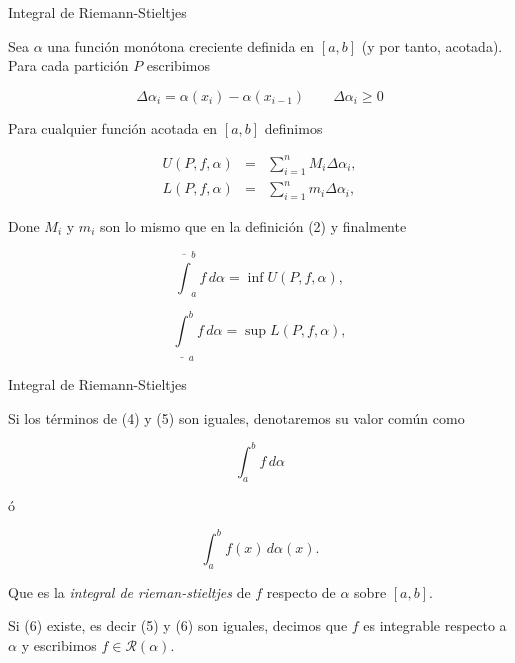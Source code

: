 \documentclass[10pt]{beamer}
\begin{document}
\begin{frame}{Integral de Riemann-Stieltjes}

Sea $\alpha$ una función monótona creciente definida en $[a, b]$ (y por tanto, acotada). Para cada partición $P$ escribimos

\[
	\Delta \alpha_i = \alpha(x_i) - \alpha(x_{i-1}) \qquad \Delta\alpha_i \geq 0
\]

Para cualquier función acotada en $[a, b]$ definimos

\[
	\begin{array}{rcl}
		U(P, f, \alpha) & = & \sum_{i=1}^n M_i \Delta \alpha_i, \\
		L(P, f, \alpha) & = & \sum_{i=1}^n m_i \Delta \alpha_i,
	\end{array}
\]

Done $M_i$ y $m_i$ son lo mismo que en la definición (2) y finalmente 

\begin{equation}
	\overline{\int}_a^b f\,d\alpha = \inf U(P, f, \alpha),
\end{equation}

\begin{equation}
	\underline{\int}_a^b f\,d\alpha = \sup L(P, f, \alpha),
\end{equation}

\end{frame}

\begin{frame}{Integral de Riemann-Stieltjes}

\begin{definition}[4]

Si los términos de (4) y (5) son iguales, denotaremos su valor común como

\begin{equation}
	\int_a^b f\,d\alpha
\end{equation}

ó

\begin{equation}
	\int_a^b f(x)\,d\alpha(x).
\end{equation}

Que es la \textit{integral de rieman-stieltjes} de $f$ respecto de $\alpha$ sobre $[a, b]$.

Si (6) existe, es decir (5) y (6) son iguales, decimos que $f$ es integrable respecto a $\alpha$ y escribimos $f \in \mathcal{R}(\alpha)$.

\end{definition}

\end{frame}
\end{document}
